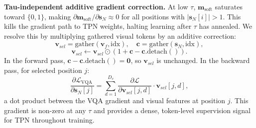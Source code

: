 \documentclass{article}
\newcommand{\vfine}{\mathbf{v}_{f}}
\newcommand{\sN}{\mathbf{s}_N}
\newcommand{\vsel}{\mathbf{v}_{sel}}
\begin{document}
\textbf{Tau-independent additive gradient correction.}
At low $\tau$, $\mathbf{m}_{\mathrm{soft}}$ saturates toward $\{0,1\}$, making
$\partial \mathbf{m}_{\mathrm{soft}} / \partial \sN \approx 0$ for all
positions with $|\sN[i]| > 1$.
This kills the gradient path to TPN weights, halting learning after $\tau$
has annealed.
We resolve this by multiplying gathered visual tokens by an additive correction:
\begin{equation}
  \vsel = \mathrm{gather}(\vfine, \text{idx}), \quad
  \mathbf{c} = \mathrm{gather}(\sN, \text{idx}), \label{eq:gather}
\end{equation}
\begin{equation}
  \vsel \leftarrow \vsel \odot (1 + \mathbf{c} - \mathbf{c}.\mathrm{detach}()).
  \label{eq:taufix}
\end{equation}
In the forward pass, $\mathbf{c} - \mathbf{c}.\mathrm{detach}() = \mathbf{0}$,
so $\vsel$ is unchanged.
In the backward pass, for selected position $j$:
\[
  \frac{\partial \mathcal{L}_\mathrm{VQA}}{\partial \sN[j]}
  = \sum_{d=1}^{D_v} \frac{\partial \mathcal{L}}{\partial \vsel[j,d]} \cdot \vsel[j,d],
\]
a dot product between the VQA gradient and visual features at position $j$.
This gradient is non-zero at any $\tau$ and provides a dense, token-level
supervision signal for TPN throughout training.
\end{document}
